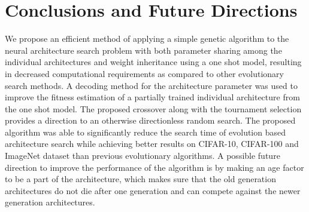 \documentclass[final]{cvpr}
\begin{document}
\section{Conclusions and Future Directions}
We propose an efficient method of applying a simple genetic algorithm to the
neural architecture search problem with both parameter sharing among the individual
architectures and weight inheritance using a one shot model, resulting in decreased
computational requirements as compared to other evolutionary search methods.
A decoding method for the architecture parameter was used to improve the fitness
estimation of a partially trained individual architecture from the one shot model.
The proposed crossover along with the tournament selection provides
a direction to an otherwise directionless random search. The proposed algorithm
was able to significantly reduce the search time of evolution based architecture search
while achieving better results on CIFAR-10, CIFAR-100 and ImageNet dataset than previous
evolutionary algorithms. A possible future direction to improve the
performance of the algorithm is by making an age factor to be a part of the architecture,
which makes sure that the old generation architectures do not die after one generation
and can compete against the newer generation architectures.

{\small


}
\end{document}

